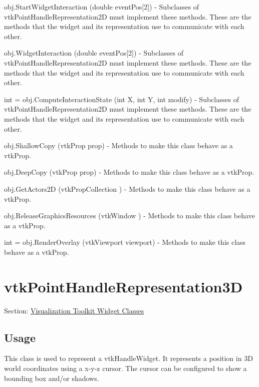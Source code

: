 \begin{DoxyItemize}
\item {\ttfamily obj.\-Start\-Widget\-Interaction (double event\-Pos\mbox{[}2\mbox{]})} -\/ Subclasses of vtk\-Point\-Handle\-Representation2\-D must implement these methods. These are the methods that the widget and its representation use to communicate with each other.  
\item {\ttfamily obj.\-Widget\-Interaction (double event\-Pos\mbox{[}2\mbox{]})} -\/ Subclasses of vtk\-Point\-Handle\-Representation2\-D must implement these methods. These are the methods that the widget and its representation use to communicate with each other.  
\item {\ttfamily int = obj.\-Compute\-Interaction\-State (int X, int Y, int modify)} -\/ Subclasses of vtk\-Point\-Handle\-Representation2\-D must implement these methods. These are the methods that the widget and its representation use to communicate with each other.  
\item {\ttfamily obj.\-Shallow\-Copy (vtk\-Prop prop)} -\/ Methods to make this class behave as a vtk\-Prop.  
\item {\ttfamily obj.\-Deep\-Copy (vtk\-Prop prop)} -\/ Methods to make this class behave as a vtk\-Prop.  
\item {\ttfamily obj.\-Get\-Actors2\-D (vtk\-Prop\-Collection )} -\/ Methods to make this class behave as a vtk\-Prop.  
\item {\ttfamily obj.\-Release\-Graphics\-Resources (vtk\-Window )} -\/ Methods to make this class behave as a vtk\-Prop.  
\item {\ttfamily int = obj.\-Render\-Overlay (vtk\-Viewport viewport)} -\/ Methods to make this class behave as a vtk\-Prop.  
\end{DoxyItemize}\hypertarget{vtkwidgets_vtkpointhandlerepresentation3d}{}\section{vtk\-Point\-Handle\-Representation3\-D}\label{vtkwidgets_vtkpointhandlerepresentation3d}
Section\-: \hyperlink{sec_vtkwidgets}{Visualization Toolkit Widget Classes} \hypertarget{vtkwidgets_vtkxyplotwidget_Usage}{}\subsection{Usage}\label{vtkwidgets_vtkxyplotwidget_Usage}
This class is used to represent a vtk\-Handle\-Widget. It represents a position in 3\-D world coordinates using a x-\/y-\/z cursor. The cursor can be configured to show a bounding box and/or shadows.

